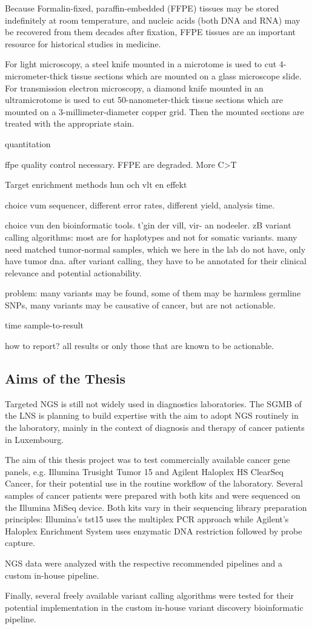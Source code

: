 Because Formalin-fixed, paraffin-embedded (FFPE) tissues may be stored
indefinitely at room temperature, and nucleic acids (both DNA and RNA) may be
recovered from them decades after fixation, FFPE tissues are an important
resource for historical studies in medicine.

For light microscopy, a steel knife mounted in a microtome is used to cut
4-micrometer-thick tissue sections which are mounted on a glass microscope
slide. For transmission electron microscopy, a diamond knife mounted in an
ultramicrotome is used to cut 50-nanometer-thick tissue sections which are
mounted on a 3-millimeter-diameter copper grid. Then the mounted sections are
treated with the appropriate stain.

quantitation

ffpe quality control necessary. FFPE are degraded. More C>T

Target enrichment methods hun och vlt en effekt

choice vum sequencer, different error rates, different yield, analysis time.

choice vun den bioinformatic tools. t'gin der vill, vir- an nodeeler. zB variant
calling algorithms: most are for haplotypes and not for somatic variants. many
need matched tumor-normal samples, which we here in the lab do not have, only have
tumor dna. after variant calling, they have to be annotated for their clinical
relevance and potential actionability.

problem: many variants may be found, some of them may be
harmless germline SNPs, many variants may be causative of cancer, but are not actionable.

time sample-to-result

how to report? all results or only those that are known to be actionable.

\subsection{Aims of the Thesis}
Targeted NGS is still not widely used in diagnostics laboratories. The SGMB of the LNS
is planning to build expertise with the aim to adopt NGS routinely in the laboratory,
mainly in the context of diagnosis and therapy of cancer patients in Luxembourg.

The aim of this thesis project was to test commercially available cancer gene panels,
e.g. Illumina Trusight Tumor 15 and Agilent Haloplex HS ClearSeq Cancer, for their
potential use in the routine workflow of the laboratory. Several samples of cancer
patients were prepared with both kits and were sequenced on the Illumina MiSeq device.
Both kits vary in their sequencing library preparation principles: Illumina's tst15
uses the multiplex PCR approach while Agilent's Haloplex Enrichment System uses
enzymatic DNA restriction followed by probe capture.

NGS data were analyzed with the respective recommended pipelines and a custom in-house
pipeline.

Finally, several freely available variant calling algorithms were tested for their
potential implementation in the custom in-house variant discovery bioinformatic
pipeline.
